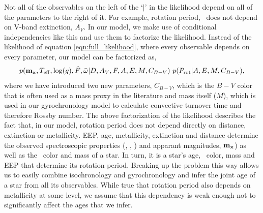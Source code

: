Not all of the observables on the left of the `$|$' in the likelihood depend
on all of the parameters to the right of it.
For example, rotation period, \prot\ does not depend on V-band extinction,
$A_V$.
In our model, we make use of conditional independencies like this and use them
to factorize the likelihood.
Instead of the likelihood of equation \ref{eqn:full_likelihood},
where every observable depends on every parameter, our model can be factorized
as,
\begin{equation} \label{eqn:factorized}
    p({\bf m_x}, T_{\mathrm{eff}}, \log(g), \hat{F}, \bar{\omega}
    |D, A_V, F, A, E, M, C_{B-V}) ~p(P_\mathrm{rot}|A, E, M, C_{B-V}),
\end{equation}
where we have introduced two new parameters, $C_{B-V}$, which is the $B-V$
color that is often used as a mass proxy in the literature and mass itself
($M$), which is used in our gyrochronology model to calculate convective
turnover time and therefore Rossby number.
The above factorization of the likelihood describes the fact that, in our
model, rotation period does not depend directly on distance, extinction or
metallicity.
EEP, age, metallicity, extinction and distance determine the observed
spectroscopic properties (\teff, \logg, \feh) and apparant magnitudes, ${\bf
m_x}$) as well as the \cbv\ color and mass of a star.
In turn, it is a star's age, \cbv\ color, mass and EEP that determine its
rotation period.
Breaking up the problem this way allows us to easily combine isochronology and
gyrochronology and infer the joint age of a star from all its observables.
While true that rotation period also depends on metallicity at some level, we
assume that this dependency is weak enough not to significantly affect the
ages that we infer.

